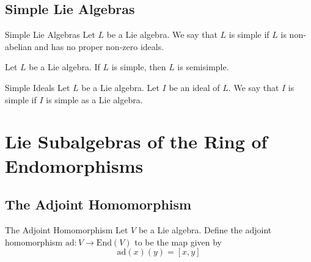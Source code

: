 \documentclass[a4paper]{article}
\begin{document}
\subsection{Simple Lie Algebras}
\begin{defn}{Simple Lie Algebras}{} Let $L$ be a Lie algebra. We say that $L$ is simple if $L$ is non-abelian and has no proper non-zero ideals. 
\end{defn}

\begin{lmm}{}{} Let $L$ be a Lie algebra. If $L$ is simple, then $L$ is semisimple. 
\end{lmm}

\begin{defn}{Simple Ideals}{} Let $L$ be a Lie algebra. Let $I$ be an ideal of $L$. We say that $I$ is simple if $I$ is simple as a Lie algebra. 
\end{defn}

\pagebreak
\section{Lie Subalgebras of the Ring of Endomorphisms}
\subsection{The Adjoint Homomorphism}
\begin{defn}{The Adjoint Homomorphism}{} Let $V$ be a Lie algebra. Define the adjoint homomorphism $\text{ad}:V\to\text{End}(V)$ to be the map given by $$\text{ad}(x)(y)=[x,y]$$
\end{defn}
\end{document}
